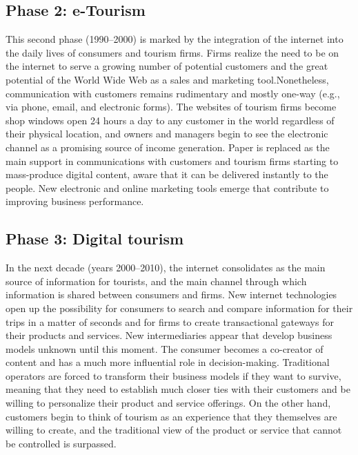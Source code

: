 \documentclass[
  letterpaper,
  DIV=11,
  numbers=noendperiod]{scrreprt}
\begin{document}
\hypertarget{phase-2-e-tourism}{%
\subsection{Phase 2: e-Tourism}\label{phase-2-e-tourism}}

This second phase (1990--2000) is marked by the integration of the
internet into the daily lives of consumers and tourism firms. Firms
realize the need to be on the internet to serve a growing number of
potential customers and the great potential of the World Wide Web as a
sales and marketing tool.Nonetheless, communication with customers
remains rudimentary and mostly one-way (e.g., via phone, email, and
electronic forms). The websites of tourism firms become shop windows
open 24 hours a day to any customer in the world regardless of their
physical location, and owners and managers begin to see the electronic
channel as a promising source of income generation. Paper is replaced as
the main support in communications with customers and tourism firms
starting to mass-produce digital content, aware that it can be delivered
instantly to the people. New electronic and online marketing tools
emerge that contribute to improving business performance.

\hypertarget{phase-3-digital-tourism}{%
\subsection{Phase 3: Digital tourism}\label{phase-3-digital-tourism}}

In the next decade (years 2000--2010), the internet consolidates as the
main source of information for tourists, and the main channel through
which information is shared between consumers and firms. New internet
technologies open up the possibility for consumers to search and compare
information for their trips in a matter of seconds and for firms to
create transactional gateways for their products and services. New
intermediaries appear that develop business models unknown until this
moment. The consumer becomes a co-creator of content and has a much more
influential role in decision-making. Traditional operators are forced to
transform their business models if they want to survive, meaning that
they need to establish much closer ties with their customers and be
willing to personalize their product and service offerings. On the other
hand, customers begin to think of tourism as an experience that they
themselves are willing to create, and the traditional view of the
product or service that cannot be controlled is surpassed.
\end{document}
